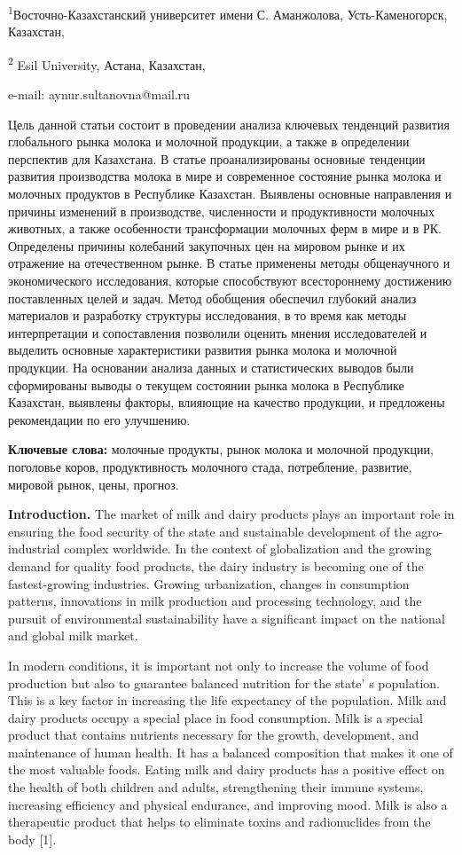 \textsuperscript{1}Восточно-Казахстанский университет имени С.
Аманжолова, Усть-Каменогорск, Казахстан,

\textsuperscript{2} Esil University, Астана, Казахстан,

e-mail: aynur.sultanovna@mail.ru

Цель данной статьи состоит в проведении анализа ключевых тенденций
развития глобального рынка молока и молочной продукции, а также в
определении перспектив для Казахстана. В статье проанализированы
основные тенденции развития производства молока в мире и современное
состояние рынка молока и молочных продуктов в Республике Казахстан.
Выявлены основные направления и причины изменений в производстве,
численности и продуктивности молочных животных, а также особенности
трансформации молочных ферм в мире и в РК. Определены причины колебаний
закупочных цен на мировом рынке и их отражение на отечественном рынке. В
статье применены методы общенаучного и экономического исследования,
которые способствуют всестороннему достижению поставленных целей и
задач. Метод обобщения обеспечил глубокий анализ материалов и разработку
структуры исследования, в то время как методы интерпретации и
сопоставления позволили оценить мнения исследователей и выделить
основные характеристики развития рынка молока и молочной продукции. На
основании анализа данных и статистических выводов были сформированы
выводы о текущем состоянии рынка молока в Республике Казахстан, выявлены
факторы, влияющие на качество продукции, и предложены рекомендации по
его улучшению.

{\bfseries Ключевые слова:} молочные продукты, рынок молока и молочной
продукции, поголовье коров, продуктивность молочного стада, потребление,
развитие, мировой рынок, цены, прогноз.

{\bfseries Introduction.} The market of milk and dairy products plays an
important role in ensuring the food security of the state and
sustainable development of the agro-industrial complex worldwide. In the
context of globalization and the growing demand for quality food
products, the dairy industry is becoming one of the fastest-growing
industries. Growing urbanization, changes in consumption patterns,
innovations in milk production and processing technology, and the
pursuit of environmental sustainability have a significant impact on the
national and global milk market.

In modern conditions, it is important not only to increase the volume of
food production but also to guarantee balanced nutrition for the
state' s population. This is a key factor in increasing
the life expectancy of the population. Milk and dairy products occupy a
special place in food consumption. Milk is a special product that
contains nutrients necessary for the growth, development, and
maintenance of human health. It has a balanced composition that makes it
one of the most valuable foods. Eating milk and dairy products has a
positive effect on the health of both children and adults, strengthening
their immune systems, increasing efficiency and physical endurance, and
improving mood. Milk is also a therapeutic product that helps to
eliminate toxins and radionuclides from the body {[}1{]}.

